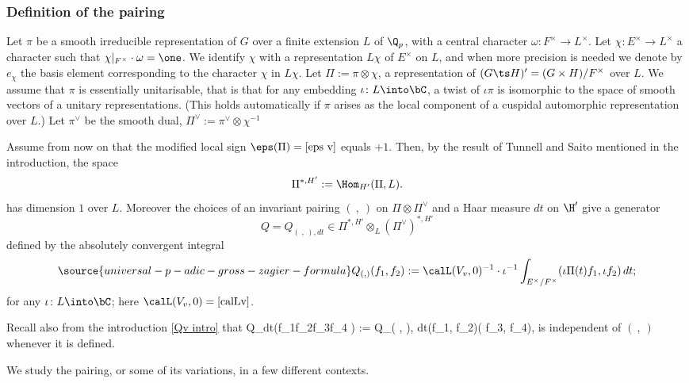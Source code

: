 \subsubsection{Definition of the pairing}
Let $\pi$ be a smooth irreducible representation of $G$ over a finite extension  $ L$  of $\Q_{p}$, with a central character $\omega\colon F^{\times}\to L^{\times}$. Let $\chi\colon E^{\times}\to L^{\times}$ a character such that $\chi|_{F^{\times}}\cdot \omega=\one$. We identify $\chi$ with a representation  $L\chi$ of $E^{\times} $ on $L$, and when more precision is needed we denote by $e_{\chi}$ the basis element corresponding to the character $\chi$ in $L\chi$.  Let  $\Pi:=\pi\otimes\chi$, a representation of $(G\ts H)'=(G\times H)/F^{\times}$ over $L$. We assume that $\pi$ is essentially unitarisable, that is  that for any embedding $\iota\colon L\into \bC$,  a twist of $\iota\pi$ is isomorphic to the space of smooth vectors of a unitary representations. (This holds automatically if $\pi $ arises as the local component of a cuspidal automorphic representation over $L$.)
Let $\pi^{\vee}$ be the smooth dual, $\Pi^{\vee}:=\pi^{\vee}\otimes \chi^{-1}$

Assume from now on  that the modified local sign  $\eps(\Pi)=\eqref{eps v}$ equals $+1$.
 Then, by the result of Tunnell and Saito mentioned in the introduction,
the space
$$\Pi^{*,H'}:={\Hom}_{H'} (\Pi, L).$$
has dimension   $1$ over $L$. Moreover the choices of an invariant pairing $(\ , \ )$ on $\Pi \otimes \Pi^{\vee}$  and a Haar measure $dt$ on $\H'$
give a   generator
$$Q=Q_{(\ , \ ), dt}\in \Pi^{*,H'}\otimes_{L} (\Pi^{\vee})^{*,H'}$$
defined by the absolutely convergent integral
\begin{gather}\label{Qpair}
\source{universal-p-adic-gross-zagier-formula}
 Q_{(, )}(f_{1}, f_{2}):=
 \calL(V_{v}, 0)^{-1}
 \cdot
\iota^{-1} \int_{E^{\times}/F^{\times}} (\iota\Pi(t) f_{1}, \iota f_{2})\, dt ;
 \end{gather}
 for any  $\iota\colon L\into \bC$; here $\calL(V_{v}, 0)=\eqref{calLv}$.

 Recall also from the introduction  \eqref{Qv intro} that
\beq\label{Qv sec4}
 Q_{dt}\left({f_{1}\ot f_{2}\over f_{3}\ot f_{4} }\right) := {Q_{( , ), dt}(f_{1}, f_{2})\over ( f_{3}, f_{4})},
\eeq
is independent of $(\ ,\ )$ whenever it is defined.




We study the pairing, or some of its variations, in a few different contexts.




